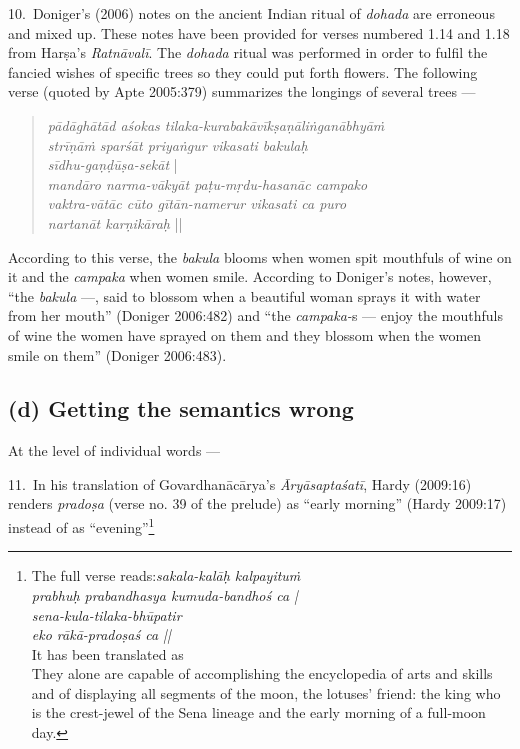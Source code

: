 10.~Doniger’s (2006) notes on the ancient Indian ritual of \textsl{dohada} are erroneous and mixed up. These notes have been provided for verses numbered 1.14 and 1.18 from Harṣa’s \textsl{Ratnāvalī}. The \textsl{dohada} ritual was performed in order to fulfil the fancied wishes of specific trees so they could put forth flowers. The following verse (quoted by Apte 2005:379) summarizes the longings of several trees ---
\begin{quote}
\textsl{pādāghātād aśokas tilaka-kurabakāvīkṣaṇāliṅganābhyāṁ}\\
\textsl{strīṇāṁ sparśāt priyaṅgur vikasati bakulaḥ}\\
\textsl{sīdhu-gaṇḍūṣa-sekāt} |\\
\textsl{mandāro narma-vākyāt paṭu-mṛdu-hasanāc campako}\\
\textsl{vaktra-vātāc cūto gītān-namerur vikasati ca puro}\\
\textsl{nartanāt karṇikāraḥ} ||
\end{quote}

According to this verse, the \textsl{bakula} blooms when women spit mouthfuls of wine on it and the \textsl{campaka} when women smile. According to Doniger’s notes, however, “the \textsl{bakula} ---, said to blossom when a beautiful woman sprays it with water from her mouth” (Doniger 2006:482) and “the \textsl{campaka-}s --- enjoy the mouthfuls of wine the women have sprayed on them and they blossom when the women smile on them” (Doniger 2006:483). 

\subsection*{(d) Getting the semantics wrong}

At the level of individual words --- 

11.~In his translation of Govardhanācārya’s \textsl{Āryāsaptaśatī}, Hardy (2009:16) renders \textsl{pradoṣa} (verse no. 39 of the prelude) as “early morning” (Hardy 2009:17) instead of as “evening”\footnote[7]{The full verse reads:\textsl{sakala-kalāḥ kalpayituṁ}\\  \textsl{prabhuḥ prabandhasya kumuda-bandhoś ca |}\\
\textsl{sena-kula-tilaka-bhūpatir}\\
\textsl{eko rākā-pradoṣaś ca ||}\\
It has been translated as\\
They alone are capable of accomplishing the encyclopedia of arts and skills and of displaying all segments of the moon, the lotuses’ friend: the king who is the crest-jewel of the Sena lineage and the early morning of a full-moon day.}

